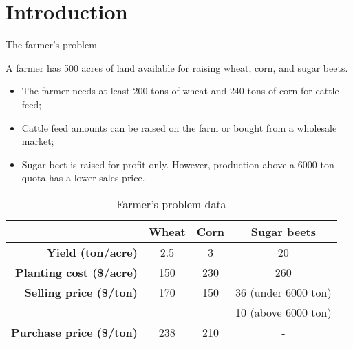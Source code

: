 \section{Introduction}

\begin{frame}{The farmer's problem {\small \cite{birge2011introduction}}}
	
	A farmer has \alert{500 acres} of land available for raising wheat, corn, and sugar beets. 
	\begin{itemize}
		\item The farmer needs at least \alert{200 tons of wheat} and \alert{240 tons of corn} for cattle feed;
		\item Cattle feed amounts can be \alert{raised} on the farm or \alert{bought} from a wholesale market;
		\item Sugar beet is raised for profit only. However, production above a \alert{6000 ton quota} has a lower sales price. 
	\end{itemize}	
	\pause
	\vspace{-6pt}
	{\small
	\begin{table}
		\begin{tabular}{r|ccc}
			& \bf Wheat & \bf Corn & \bf Sugar beets \\ \hline
			\bf Yield (ton/acre) & 2.5 & 3 & 20 \\
			\bf Planting cost (\$/acre) & 150 & 230 & 260 \\
			\bf Selling price (\$/ton) & 170 & 150  & 36 (under 6000 ton) \\
								   & 	 &	    & 10 (above 6000 ton) \\
			\bf Purchase price (\$/ton)& 238 & 210  & - \\ \hline					    
		\end{tabular}
		\caption{Farmer's problem data}		
	\end{table}
	}
	
\end{frame}


